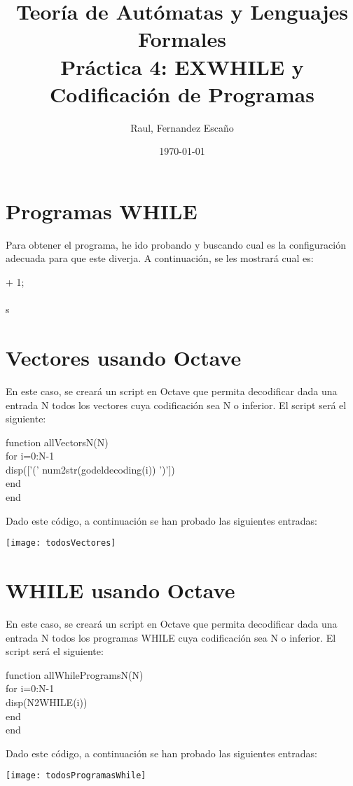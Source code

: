 \documentclass{article}
\title{Teoría de Autómatas y Lenguajes Formales\\[.4\baselineskip]Práctica 4: EXWHILE y Codificación de Programas}
\author{Raul, Fernandez Escaño}
\date{\today}
\begin{document}

\maketitle

\section{Programas WHILE}
\begin{flushleft}Para obtener el programa, he ido probando y buscando cual es la configuración adecuada para que este diverja. A continuación, se les mostrará cual es:\end{flushleft}

 {
	\Assig{} + 1; \\
	 {
		 \\
	} 
}{s}

\section{Vectores usando Octave}

\begin{flushleft}En este caso, se creará un script en Octave que permita decodificar dada una entrada N todos los vectores cuya codificación sea N o inferior. El script será el siguiente: \end{flushleft}
function allVectorsN(N) \\
  for i=0:N-1 \\
    disp(['(' num2str(godeldecoding(i)) ')']) \\
  end \\
end

\begin{flushleft}Dado este código, a continuación se han probado las siguientes entradas:\end{flushleft}

\texttt{[image: todosVectores]}

\section{WHILE usando Octave}

\begin{flushleft}En este caso, se creará un script en Octave que permita decodificar dada una entrada N todos los programas WHILE cuya codificación sea N o inferior. El script será el siguiente: \end{flushleft}
function allWhileProgramsN(N) \\
  for i=0:N-1 \\
    disp(N2WHILE(i)) \\
  end \\
end

\begin{flushleft}Dado este código, a continuación se han probado las siguientes entradas:\end{flushleft}

\texttt{[image: todosProgramasWhile]}
\end{document}
